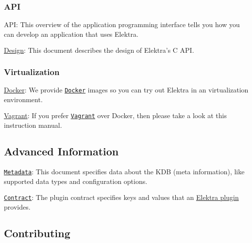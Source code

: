 \subsubsection*{A\+PI}


\begin{DoxyItemize}
\item A\+PI\+: This overview of the application programming interface tells you how you can develop an application that uses Elektra.
\item \hyperlink{doc_DESIGN_md}{Design}\+: This document describes the design of Elektra’s C A\+PI.
\end{DoxyItemize}

\subsubsection*{Virtualization}


\begin{DoxyItemize}
\item \hyperlink{doc_docker_README_md}{Docker}\+: We provide \href{https://docker.com}{\tt Docker} images so you can try out Elektra in an virtualization environment.
\item \hyperlink{doc_vagrant_README_md}{Vagrant}\+: If you prefer \href{https://www.vagrantup.com}{\tt Vagrant} over Docker, then please take a look at this instruction manual.
\end{DoxyItemize}

\subsection*{Advanced Information}


\begin{DoxyItemize}
\item \href{/home/markus/Projekte/Elektra/current/doc/METADATA.ini}{\tt Metadata}\+: This document specifies data about the K\+DB (meta information), like supported data types and configuration options.
\item \href{/home/markus/Projekte/Elektra/current/doc/CONTRACT.ini}{\tt Contract}\+: The plugin contract specifies keys and values that an \hyperlink{md_src_plugins_README_src_plugins_README_md}{Elektra plugin} provides.
\end{DoxyItemize}

\subsection*{Contributing}



